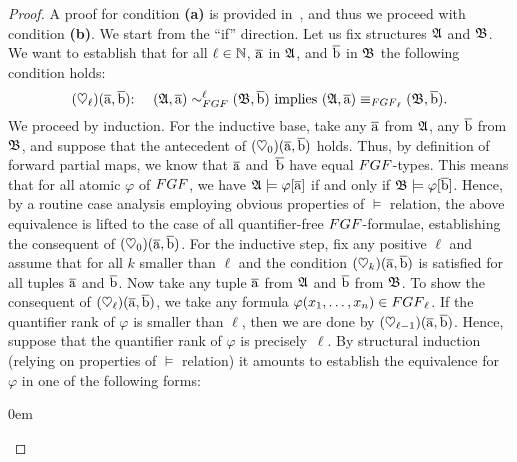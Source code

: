 \begin{proof}
  A proof for condition \textbf{(a)} is provided in~\cite[Lemma 3]{BednarczykJ22}, and thus we proceed with condition \textbf{(b)}.
  We start from the ``if'' direction.
  Let us fix structures ${\mathfrak{A}}$ and ${\mathfrak{B}}$.
  We want to establish that for all $\ell \in {\mathbb{N}}$, $\overline{\mathrm{a}}$ in ${\mathfrak{A}}$, and $\overline{\mathrm{b}}$ in ${\mathfrak{B}}$ the following condition holds:
  \[
    (\heartsuit_\ell)(\elemtuplea, \elemtupleb){:} \ \ \ \  (\str{A}, \elemtuplea) \bisimto_{\FGF}^{\ell} (\str{B}, \elemtupleb) \ \text{implies} \ (\str{A}, \elemtuplea) \equiv_{\FGF_\ell} (\str{B}, \elemtupleb).
  \]
  We proceed by induction.
  For the inductive base, take any $\overline{\mathrm{a}}$ from ${\mathfrak{A}}$, any $\overline{\mathrm{b}}$ from ${\mathfrak{B}}$, and suppose that the antecedent of $(\heartsuit_0)(\overline{\mathrm{a}},\overline{\mathrm{b}})$ holds.
  Thus, by definition of forward partial maps, we know that $\overline{\mathrm{a}}$ and~$\overline{\mathrm{b}}$ have equal $\FGF$-types.
  This means that for all atomic $\varphi$ of $\FGF$, we have ${\mathfrak{A}} \models \varphi[\overline{\mathrm{a}}]$ if and only if ${\mathfrak{B}} \models \varphi[\overline{\mathrm{b}}]$.
  Hence, by a routine case analysis employing obvious properties of $\models$ relation, the above equivalence is lifted to the case of all quantifier-free $\FGF$-formulae, establishing the consequent of $(\heartsuit_0)(\overline{\mathrm{a}},\overline{\mathrm{b}})$.
  For the inductive step, fix any positive $\ell$ and assume that for all $k$ smaller than $\ell$ and the condition $(\heartsuit_k)(\overline{\mathrm{a}},\overline{\mathrm{b}})$ is satisfied for all tuples $\overline{\mathrm{a}}$ and $\overline{\mathrm{b}}$.
  Now take any tuple $\overline{\mathrm{a}}$ from ${\mathfrak{A}}$ and $\overline{\mathrm{b}}$ from ${\mathfrak{B}}$.
  To show the consequent of $(\heartsuit_\ell)(\overline{\mathrm{a}},\overline{\mathrm{b}})$, we take any formula $\varphi(x_1, \ldots, x_n) \in \FGF_\ell$.
  If the quantifier rank of $\varphi$ is smaller than $\ell$, then we are done by $(\heartsuit_{\ell{-}1})(\overline{\mathrm{a}},\overline{\mathrm{b}})$.
  Hence, suppose that the quantifier rank of $\varphi$ is precisely~$\ell$.
  By structural induction (relying on properties of $\models$ relation) it amounts to establish the equivalence for $\varphi$ in one of the following forms:
  \begin{itemize}\itemsep0em


\end{itemize}
\end{proof}
